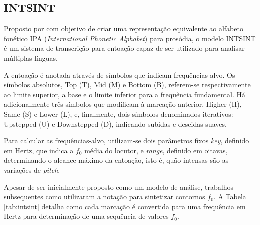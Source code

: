 

\subsection{INTSINT}
\label{intsintsec}
Proposto por  com objetivo de criar uma representação
equivalente ao alfabeto fonético IPA (\emph{International Phonetic Alphabet})
para prosódia, o modelo INTSINT é um sistema de transcrição para entoação capaz
de ser utilizado para analisar múltiplas línguas.

A entoação é anotada através de símbolos que indicam frequências-alvo. Os
símbolos absolutos, Top (T), Mid (M) e Bottom (B), referem-se respectivamente ao
limite superior, a base e o limite inferior para a frequência fundamental. Há
adicionalmente três símbolos que modificam à marcação anterior, Higher (H), Same (S)
e Lower (L), e, finalmente, dois símbolos denominados iterativos: Upstepped (U)
e Downstepped (D), indicando subidas e descidas suaves.

Para calcular as frequências-alvo, utilizam-se dois parâmetros fixos
\emph{key}, definido em Hertz, que indica a $ f_0 $ média do locutor, e \emph{range},
definido em oitavas, determinando o alcance máximo da entoação, isto é, quão
intensas são as variações de \emph{pitch}.

Apesar de ser inicialmente proposto como um modelo de análise, trabalhos
subsequentes como  utilizaram a notação para sintetizar
contornos $ f_0 $. A Tabela \ref{tab:intsint} detalha como cada marcação é convertida
para uma frequência em Hertz para determinação de uma sequência de valores $ f_0 $.

